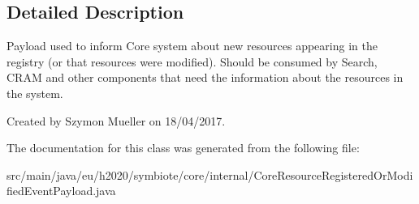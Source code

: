 \subsection{Detailed Description}
Payload used to inform Core system about new resources appearing in the registry (or that resources were modified). Should be consumed by Search, C\+R\+AM and other components that need the information about the resources in the system.

Created by Szymon Mueller on 18/04/2017. 

The documentation for this class was generated from the following file\+:\begin{DoxyCompactItemize}
\item 
src/main/java/eu/h2020/symbiote/core/internal/Core\+Resource\+Registered\+Or\+Modified\+Event\+Payload.\+java\end{DoxyCompactItemize}
